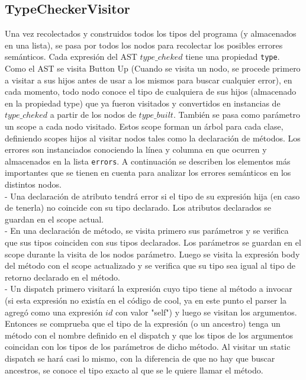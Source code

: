 \documentclass[a4paper,12pt]{article}
\def\code#1{\texttt{#1}}
\begin{document}
\subsection*{TypeCheckerVisitor}
Una vez recolectados y construidos todos los tipos del programa (y almacenados en una lista), se pasa por todos los nodos para recolectar los posibles errores semánticos. Cada expresión del AST $type\_cheked$ tiene una propiedad \code{type}. Como el AST se visita Button Up (Cuando se visita un nodo, se procede primero a visitar a sus hijos antes de usar a los mismos para buscar cualquier error), en cada momento, todo nodo conoce el tipo de cualquiera de sus hijos (almacenado en la propiedad type) que ya fueron visitados y convertidos en instancias de $type\_cheked$ a partir de los nodos de $type\_built$. También se pasa como parámetro un scope a cada nodo visitado. Estos scope forman un árbol para cada clase, definiendo scopes hijos al visitar nodos tales como la declaración de métodos. Los errores son instanciados conociendo la línea y columna en que ocurren y almacenados en la lista \code{errors}. A continuación se describen los elementos más importantes que se tienen en cuenta para analizar los errores semánticos en los distintos nodos.\\

- Una declaración de atributo tendrá error si el tipo de su expresión hija (en caso de tenerla) no coincide con su tipo declarado. Los atributos declarados se guardan en el scope actual.\\

- En una declaración de método, se visita primero sus parámetros y se verifica que sus tipos coinciden con sus tipos declarados. Los parámetros se guardan en el scope durante la visita de los nodos parámetro. Luego se visita la expresión body del método con el scope actualizado y se verifica que su tipo sea igual al tipo de retorno declarado en el método.\\

- Un dispatch primero visitará la expresión cuyo tipo tiene al método a invocar (si esta expresión no existía en el código de cool, ya en este punto el parser la agregó como una expresión $id$ con valor "self") y luego se visitan los argumentos. Entonces se comprueba que el tipo de la expresión (o un ancestro) tenga un método con el nombre definido en el dispatch y que los tipos de los argumentos coincidan con los tipos de los parámetros de dicho método. Al visitar un static dispatch se hará casi lo mismo, con la diferencia de que no hay que buscar ancestros, se conoce el tipo exacto al que se le quiere llamar el método.\\
\end{document}
